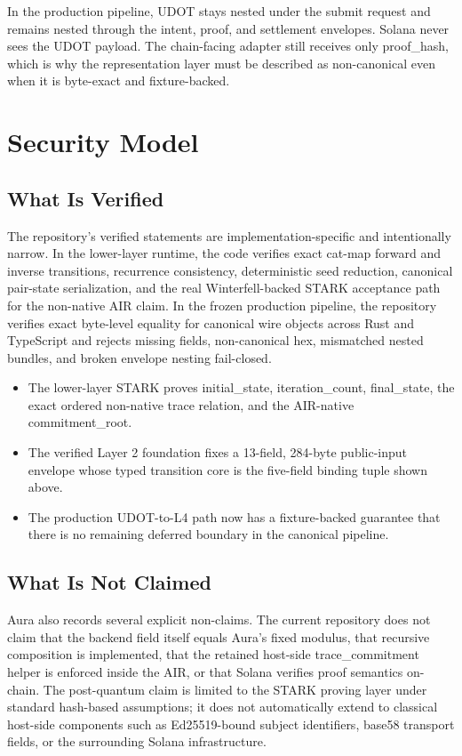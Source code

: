 \documentclass[conference]{IEEEtran}
\begin{document}
In the production pipeline, UDOT stays nested under the submit request and remains nested through the intent, proof, and settlement envelopes. Solana never sees the UDOT payload. The chain-facing adapter still receives only proof\_hash, which is why the representation layer must be described as non-canonical even when it is byte-exact and fixture-backed.

\section{Security Model}
\subsection{What Is Verified}
The repository's verified statements are implementation-specific and intentionally narrow. In the lower-layer runtime, the code verifies exact cat-map forward and inverse transitions, recurrence consistency, deterministic seed reduction, canonical pair-state serialization, and the real Winterfell-backed STARK acceptance path for the non-native AIR claim. In the frozen production pipeline, the repository verifies exact byte-level equality for canonical wire objects across Rust and TypeScript and rejects missing fields, non-canonical hex, mismatched nested bundles, and broken envelope nesting fail-closed.

\begin{itemize}
\item The lower-layer STARK proves initial\_state, iteration\_count, final\_state, the exact ordered non-native trace relation, and the AIR-native commitment\_root.
\item The verified Layer 2 foundation fixes a 13-field, 284-byte public-input envelope whose typed transition core is the five-field binding tuple shown above.
\item The production UDOT-to-L4 path now has a fixture-backed guarantee that there is no remaining deferred boundary in the canonical pipeline.
\end{itemize}
\subsection{What Is Not Claimed}
Aura also records several explicit non-claims. The current repository does not claim that the backend field itself equals Aura's fixed modulus, that recursive composition is implemented, that the retained host-side trace\_commitment helper is enforced inside the AIR, or that Solana verifies proof semantics on-chain. The post-quantum claim is limited to the STARK proving layer under standard hash-based assumptions; it does not automatically extend to classical host-side components such as Ed25519-bound subject identifiers, base58 transport fields, or the surrounding Solana infrastructure.
\end{document}
